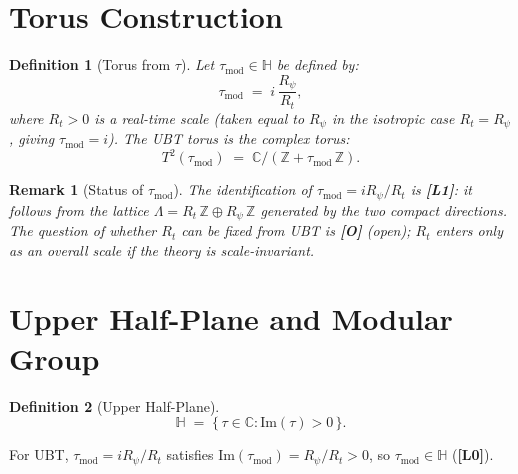 \documentclass[11pt,a4paper]{article}
\newtheorem{definition}{Definition}
\newtheorem{remark}{Remark}
\begin{document}
\section{Torus Construction}
\label{sec:torus}

\begin{definition}[Torus from $\tau$]\label{def:torus}
Let $\tau_{\mathrm{mod}} \in \mathbb{H}$ be defined by:
\begin{equation}
  \tau_{\mathrm{mod}} \;=\; i\,\frac{R_\psi}{R_t},
\end{equation}
where $R_t > 0$ is a real-time scale (taken equal to $R_\psi$ in the
isotropic case $R_t = R_\psi$, giving $\tau_{\mathrm{mod}} = i$).
The UBT torus is the complex torus:
\begin{equation}
  T^2(\tau_{\mathrm{mod}}) \;=\; \mathbb{C}\big/\!\left(\mathbb{Z} + \tau_{\mathrm{mod}}\,\mathbb{Z}\right).
\end{equation}
\end{definition}

\begin{remark}[Status of $\tau_{\mathrm{mod}}$]
The identification of $\tau_{\mathrm{mod}} = iR_\psi/R_t$ is \textbf{[L1]}:
it follows from the lattice $\Lambda = R_t\,\mathbb{Z} \oplus R_\psi\,\mathbb{Z}$
generated by the two compact directions. The question of whether $R_t$ can be
fixed from UBT is \textbf{[O]} (open); $R_t$ enters only as an overall scale
if the theory is scale-invariant.
\end{remark}

\section{Upper Half-Plane and Modular Group}
\label{sec:upper_half_plane}

\begin{definition}[Upper Half-Plane]
\begin{equation}
  \mathbb{H} \;=\; \{\,\tau \in \mathbb{C} : \mathrm{Im}(\tau) > 0\,\}.
\end{equation}
\end{definition}

For UBT, $\tau_{\mathrm{mod}} = iR_\psi/R_t$ satisfies $\mathrm{Im}(\tau_{\mathrm{mod}}) = R_\psi/R_t > 0$,
so $\tau_{\mathrm{mod}} \in \mathbb{H}$ (\textbf{[L0]}).
\end{document}
